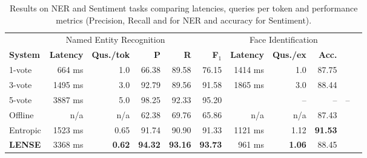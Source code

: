 \begin{table}[t]
\begin{tabular}{l r r r r r | r r r r r}
  \multicolumn{6}{c|}{Named Entity Recognition} & 
      \multicolumn{3}{c}{Face Identification} \\
      \textbf{System} & \textbf{Latency} & \textbf{Qus./tok} & \textbf{P} & \textbf{R} & \textbf{F$_1$} 
          & \textbf{Latency} & \textbf{Qus./ex} & \textbf{Acc.} 
    \\ \hline
    1-vote & 664 ms & 1.0 & 66.38 & 89.58 & 76.15 
      & %
      1414 ms & 1.0 & 87.75 \\ %
    3-vote & 1495 ms & 3.0 & 92.79 & 89.56 & 91.58 
        & %
        1865 ms & 3.0 & 88.44 \\ %
    5-vote & 3887 ms & 5.0 & 98.25 & 92.33 & 95.20 
        & 
        & -- & -- & -- \\
    Offline & n/a & n/a & 62.38 & 69.76 & 65.86 
        & n/a & n/a & 87.43 \\    %
    Entropic & 1523 ms & 0.65 & 91.74 & 90.90 & 91.33 
        & 1121 ms & 1.12 & \textbf{91.53} \\ %
    \textbf{LENSE} & 3368 ms & \textbf{0.62} & \textbf{94.32} & \textbf{93.16} & \textbf{93.73} 
    & 961 ms & \textbf{1.06} & 88.45 \\   %
\end{tabular}
\caption{Results on NER and Sentiment tasks comparing latencies, queries per token and performance metrics (Precision, Recall and \fone{} for NER and accuracy for Sentiment).}
\label{tbl:results}
\end{table}

